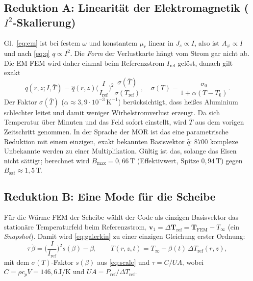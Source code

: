 \documentclass[a4paper, 10pt, conference]{ieeeconf}
\theoremstyle{remark}
\begin{document}
\subsection{Reduktion A: Linearität der Elektromagnetik ($I^2$-Skalierung)}
Gl.~\eqref{eq:em} ist bei festem $\omega$ und konstantem $\mu_r$ linear
in $J_s\propto I$, also ist $A_\varphi\propto I$ und nach \eqref{eq:q}
$q\propto I^2$. Die \emph{Form} der Verlustkarte hängt vom Strom gar nicht
ab. Die EM-FEM wird daher einmal beim Referenzstrom $I_{\mathrm{ref}}$
gelöst, danach gilt exakt
\begin{equation}
  q(r,z;I,\bar T)=\hat q(r,z)\Big(\frac{I}{I_{\mathrm{ref}}}\Big)^{\!2}
  \frac{\sigma(\bar T)}{\sigma(T_{\mathrm{ref}})},\quad
  \sigma(T)=\frac{\sigma_0}{1+\alpha(T-T_0)} .
  \label{eq:scale}
\end{equation}
Der Faktor $\sigma(\bar T)$ ($\alpha\approx3{,}9\cdot10^{-3}\,\mathrm K^{-1}$)
berücksichtigt, dass heißes Aluminium schlechter leitet und damit weniger
Wirbelstromverlust erzeugt. Da sich Temperatur über Minuten und das
Feld sofort einstellt, wird $\bar T$ aus dem vorigen Zeitschritt genommen.
In der Sprache der MOR ist das eine parametrische Reduktion mit einem
einzigen, exakt bekannten Basisvektor $\hat q$: $8700$ komplexe
Unbekannte werden zu einer Multiplikation. Gültig ist das, solange das
Eisen nicht sättigt; berechnet wird $B_{\max}=0{,}66\,\mathrm T$
(Effektivwert, Spitze $0{,}94\,\mathrm T$) gegen
$B_{\mathrm{sat}}\approx1{,}5\,\mathrm T$.

\subsection{Reduktion B: Eine Mode für die Scheibe}
Für die Wärme-FEM der Scheibe wählt der Code als einzigen Basisvektor das
stationäre Temperaturfeld beim Referenzstrom,
$\mathbf v_1=\Delta\mathbf T_{\mathrm{ref}}=\mathbf T_{\mathrm{FEM}}-T_\infty$
(ein \emph{Snapshot}). Damit wird \eqref{eq:galerkin} zu einer einzigen
Gleichung erster Ordnung:
\begin{equation}
  \tau\,\dot\beta=\Big(\frac{I}{I_{\mathrm{ref}}}\Big)^{\!2}s(\beta)-\beta,
  \qquad T(r,z,t)=T_\infty+\beta(t)\,\Delta T_{\mathrm{ref}}(r,z),
  \label{eq:rom1}
\end{equation}
mit dem $\sigma(T)$-Faktor $s(\beta)$ aus \eqref{eq:scale} und
$\tau=C/UA$, wobei $C=\rho c_p V=146{,}6\,\mathrm{J/K}$ und
$UA=P_{\mathrm{ref}}/\overline{\Delta T}_{\mathrm{ref}}$.
\end{document}
